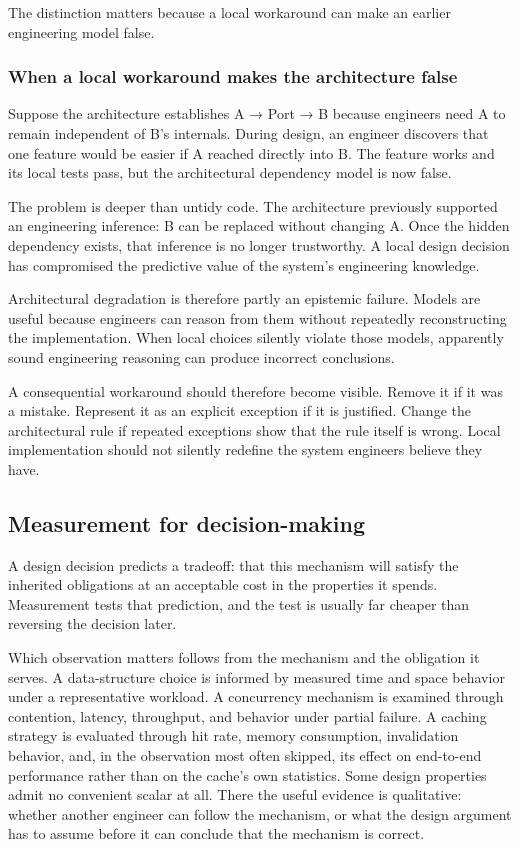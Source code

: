 The distinction matters because a local workaround can make an earlier engineering model false.

\subsubsection{When a local workaround makes the architecture false}\label{when-a-local-workaround-makes-the-architecture-false}

Suppose the architecture establishes A → Port → B because engineers need A to remain independent of B's internals.
During design, an engineer discovers that one feature would be easier if A reached directly into B.
The feature works and its local tests pass, but the architectural dependency model is now false.

The problem is deeper than untidy code.
The architecture previously supported an engineering inference: B can be replaced without changing A.
Once the hidden dependency exists, that inference is no longer trustworthy.
A local design decision has compromised the predictive value of the system's engineering knowledge.

Architectural degradation is therefore partly an epistemic failure.
Models are useful because engineers can reason from them without repeatedly reconstructing the implementation.
When local choices silently violate those models, apparently sound engineering reasoning can produce incorrect conclusions.

A consequential workaround should therefore become visible.
Remove it if it was a mistake.
Represent it as an explicit exception if it is justified.
Change the architectural rule if repeated exceptions show that the rule itself is wrong.
Local implementation should not silently redefine the system engineers believe they have.

\subsection{Measurement for decision-making}\label{sec-measurement-design}

A design decision predicts a tradeoff: that this mechanism will satisfy the inherited obligations at
an acceptable cost in the properties it spends. Measurement tests that prediction, and the test is
usually far cheaper than reversing the decision later.

Which observation matters follows from the mechanism and the obligation it serves. A data-structure
choice is informed by measured time and space behavior under a representative workload. A concurrency
mechanism is examined through contention, latency, throughput, and behavior under partial failure. A
caching strategy is evaluated through hit rate, memory consumption, invalidation behavior, and, in
the observation most often skipped, its effect on end-to-end performance rather than on the cache's
own statistics. Some design properties admit no convenient scalar at all. There the useful evidence
is qualitative: whether another engineer can follow the mechanism, or what the design argument has to
assume before it can conclude that the mechanism is correct.

